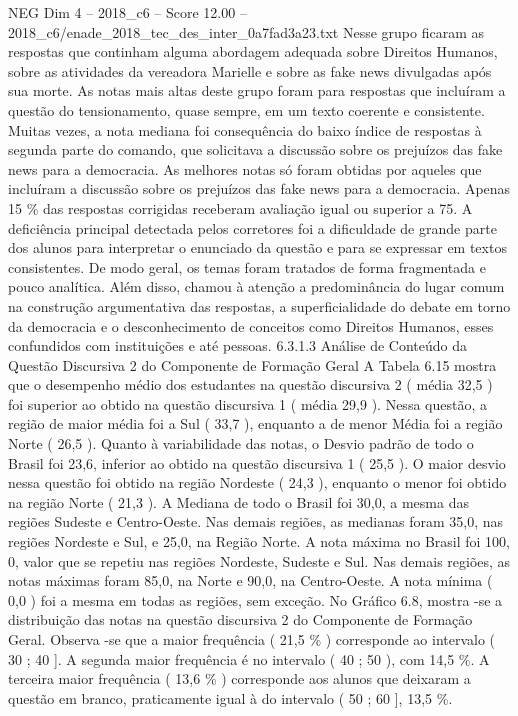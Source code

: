 \begin{textsample}{NEG Dim 4 – 2018\_c6 – Score 12.00 – 2018\_c6/enade\_2018\_tec\_des\_inter\_0a7fad3a23.txt}
Nesse grupo ficaram as respostas que continham alguma abordagem adequada sobre Direitos Humanos, sobre as atividades da vereadora Marielle e sobre as fake news divulgadas após sua morte.
As notas mais altas deste grupo foram para respostas que incluíram a questão do tensionamento, quase sempre, em um texto coerente e consistente.
Muitas vezes, a nota mediana foi consequência do baixo índice de respostas à segunda parte do comando, que solicitava a discussão sobre os prejuízos das fake news para a democracia.
As melhores notas só foram obtidas por aqueles que incluíram a discussão sobre os prejuízos das fake news para a democracia.
Apenas 15 \% das respostas corrigidas receberam avaliação igual ou superior a 75.
A deficiência principal detectada pelos corretores foi a dificuldade de grande parte dos alunos para interpretar o enunciado da questão e para se expressar em textos consistentes.
De modo geral, os temas foram tratados de forma fragmentada e pouco analítica.
Além disso, chamou à atenção a predominância do lugar comum na construção argumentativa das respostas, a superficialidade do debate em torno da democracia e o desconhecimento de conceitos como Direitos Humanos, esses confundidos com instituições e até pessoas. 6.3.1.3 Análise de Conteúdo da Questão Discursiva 2 do Componente de Formação Geral A Tabela 6.15 mostra que o desempenho médio dos estudantes na questão discursiva 2 ( média 32,5 ) foi superior ao obtido na questão discursiva 1 ( média 29,9 ).
Nessa questão, a região de maior média foi a Sul ( 33,7 ), enquanto a de menor Média foi a região Norte ( 26,5 ).
Quanto à variabilidade das notas, o Desvio padrão de todo o Brasil foi 23,6, inferior ao obtido na questão discursiva 1 ( 25,5 ).
O maior desvio nessa questão foi obtido na região Nordeste ( 24,3 ), enquanto o menor foi obtido na região Norte ( 21,3 ).
A Mediana de todo o Brasil foi 30,0, a mesma das regiões Sudeste e Centro-Oeste.
Nas demais regiões, as medianas foram 35,0, nas regiões Nordeste e Sul, e 25,0, na Região Norte.
A nota máxima no Brasil foi 100, 0, valor que se repetiu nas regiões Nordeste, Sudeste e Sul.
Nas demais regiões, as notas máximas foram 85,0, na Norte e 90,0, na Centro-Oeste.
A nota mínima ( 0,0 ) foi a mesma em todas as regiões, sem exceção.
No Gráfico 6.8, mostra -se a distribuição das notas na questão discursiva 2 do Componente de Formação Geral.
Observa -se que a maior frequência ( 21,5 \% ) corresponde ao intervalo ( 30 ; 40 ].
A segunda maior frequência é no intervalo ( 40 ; 50 ), com 14,5 \%.
A terceira maior frequência ( 13,6 \% ) corresponde aos alunos que deixaram a questão em branco, praticamente igual à do intervalo ( 50 ; 60 ], 13,5 \%.

\end{textsample}

